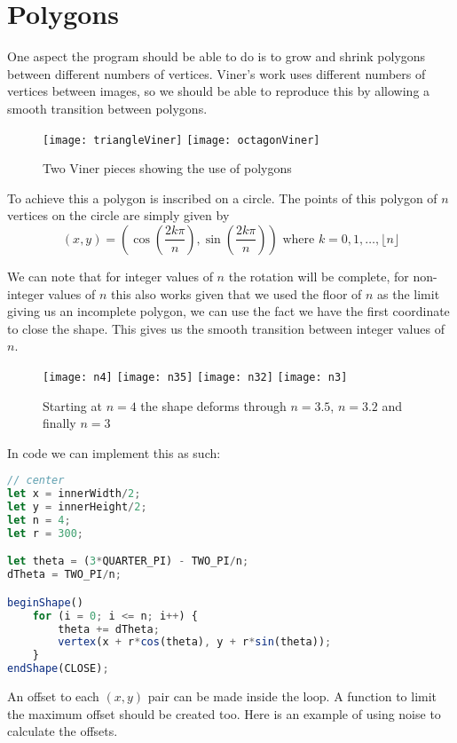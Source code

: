 \section{Polygons}
\label{Polygons}
One aspect the program should be able to do is to grow and shrink polygons
between different numbers of vertices. Viner's work uses different numbers of
vertices between images, so we should be able to reproduce this by allowing a
smooth transition between polygons. 

\begin{figure}[H]
    \centering
    \texttt{[image: triangleViner]}
    \hspace{0.2cm}
    \texttt{[image: octagonViner]}
    \caption{Two Viner pieces showing the use of polygons}
\end{figure}


To achieve this a polygon is inscribed on a circle. The points of this polygon
of $n$ vertices on the circle are simply given by $$(x, y) = (\cos(\frac{2k
\pi}{n}), \sin(\frac{2k\pi}{n})) \text{ where } k = 0, 1, \ldots, \lfloor n
\rfloor$$ 

We can note that for integer values of $n$ the rotation will be complete, for
non-integer values of $n$ this also works given that we used the floor of $n$ as
the limit giving us an incomplete polygon, we can use the fact we have the first
coordinate to close the shape. This gives us the smooth transition between
integer values of $n$.

\begin{figure}[H]
    \centering
    \texttt{[image: n4]}
    \texttt{[image: n35]}
    \texttt{[image: n32]}
    \texttt{[image: n3]}
    \caption{Starting at $n=4$ the shape deforms through $n=3.5$, $n=3.2$ and
    finally $n=3$}
\end{figure}

In code we can implement this as such:
\begin{lstlisting}[language=JavaScript]
// center
let x = innerWidth/2;
let y = innerHeight/2;
let n = 4;
let r = 300;

let theta = (3*QUARTER_PI) - TWO_PI/n;
dTheta = TWO_PI/n;

beginShape()
    for (i = 0; i <= n; i++) {
        theta += dTheta;
        vertex(x + r*cos(theta), y + r*sin(theta));
    }
endShape(CLOSE);
\end{lstlisting}

An offset to each $(x,y)$ pair can be made inside the loop. A function to limit
the maximum offset should be created too. Here is an example of using noise to
calculate the offsets.

